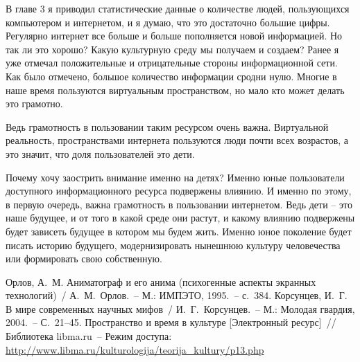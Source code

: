   В главе 3 я приводил статистические данные о количестве людей, пользующихся
  компьютером и интернетом, и я думаю, что это достаточно большие цифры.
  Регулярно интернет все больше и больше пополняется новой информацией. Но так
  ли это хорошо? Какую культурную среду мы получаем и создаем? Ранее я уже
  отмечал положительные и отрицательные стороны информационной сети. Как было
  отмечено, большое количество информации сродни нулю. Многие в наше время
  пользуются виртуальным пространством, но мало кто может делать это грамотно.
  	
  Ведь грамотность в пользовании таким ресурсом очень важна. Виртуальной
  реальность, пространствами интернета пользуются люди почти всех возрастов, а
  это значит, что доля пользователей это дети.
  	
  Почему хочу заострить внимание именно на детях? Именно юные пользователи
  доступного информационного ресурса подвержены влиянию. И именно по этому, в
  первую очередь, важна грамотность в пользовании интернетом. Ведь дети – это
  наше будущее, и от того в какой среде они растут, и какому влиянию подвержены
  будет зависеть будущее в котором мы будем жить. Именно юное поколение будет
  писать историю будущего, модернизировать нынешнюю культуру человечества или
  формировать свою собственную.
    
  \newpage

  \renewcommand{\bibname}{Список литературы}
  \begin{thebibliography}{9}
     Орлов, А.~М. Аниматограф и его анима (психогенные аспекты
      экранных технологий)~/ А.~М.~Орлов.~-- М.: ИМПЭТО, 1995.~-- с.~384.
     Корсунцев, И.~Г. В мире современных научных мифов~/
      И.~Г.~Корсунцев.~-- М.: Молодая гвардия, 2004.~-- С.~21--45.
     Пространство и время в культуре [Электронный ресурс]~//
      Библиотека libma.ru~-- Режим доступа:\\
      \url{http://www.libma.ru/kulturologija/teorija_kultury/p13.php}
  \end{thebibliography}


